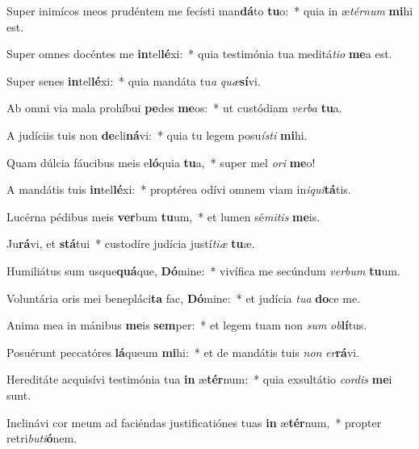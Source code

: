 \item Super inimícos meos prudéntem me fecísti man\textbf{dá}to \textbf{tu}o:~* quia in æ\textit{tér}\textit{num} \textbf{mi}hi est.
\item Super omnes docéntes me \textbf{in}tel\textbf{lé}xi:~* quia testimónia tua meditá\textit{ti}\textit{o} \textbf{me}a est.
\item Super senes \textbf{in}tel\textbf{lé}xi:~* quia mandáta tu\textit{a} \textit{quæ}\textbf{sí}vi.
\item Ab omni via mala prohíbui \textbf{pe}des \textbf{me}os:~* ut custódiam \textit{ver}\textit{ba} \textbf{tu}a.
\item A judíciis tuis non \textbf{de}cli\textbf{ná}vi:~* quia tu legem posu\textit{ís}\textit{ti} \textbf{mi}hi.
\item Quam dúlcia fáucibus meis e\textbf{ló}quia \textbf{tu}a,~* super mel \textit{o}\textit{ri} \textbf{me}o!
\item A mandátis tuis \textbf{in}tel\textbf{lé}xi:~* proptérea odívi omnem viam in\textit{i}\textit{qui}\textbf{tá}tis.
\item Lucérna pédibus meis \textbf{ver}bum \textbf{tu}um,~* et lumen sé\textit{mi}\textit{tis} \textbf{me}is.
\item Ju\textbf{rá}vi, et \textbf{stá}tui~* custodíre judícia justí\textit{ti}\textit{æ} \textbf{tu}æ.
\item Humiliátus sum usque\textbf{quá}que, \textbf{Dó}mine:~* vivífica me secúndum \textit{ver}\textit{bum} \textbf{tu}um.
\item Voluntária oris mei benepláci\textbf{ta} fac, \textbf{Dó}mine:~* et judícia \textit{tu}\textit{a} \textbf{do}ce me.
\item Anima mea in mánibus \textbf{me}is \textbf{sem}per:~* et legem tuam non \textit{sum} \textit{ob}\textbf{lí}tus.
\item Posuérunt peccatóres \textbf{lá}queum \textbf{mi}hi:~* et de mandátis tuis \textit{non} \textit{er}\textbf{rá}vi.
\item Hereditáte acquisívi testimónia tua \textbf{in} æ\textbf{tér}num:~* quia exsultátio \textit{cor}\textit{dis} \textbf{me}i sunt.
\item Inclinávi cor meum ad faciéndas justificatiónes tuas \textbf{in} æ\textbf{tér}num,~* propter retri\textit{bu}\textit{ti}\textbf{ó}nem.
